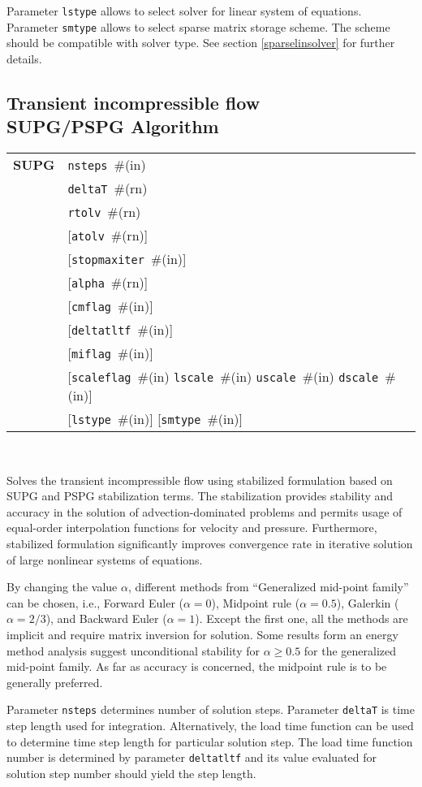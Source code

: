 \documentclass[a4paper]{report}
\newcommand{\param}[1]{\texttt{#1}} %
\newcommand{\optional}[1]{[#1]} %
\newcommand{\field}[2]{\param{#1}~\#{\tiny(#2)}} %
\newcommand{\optField}[2]{\optional{\field{#1}{#2}}}
\newcommand{\entKeywordInst}[1]{\textbf{#1}} %
\newenvironment{record}[1][]{\begin{tabular}{|ll}}{\end{tabular}\\}
\newcommand{\recentry}[2]{{#1}&{#2}\\}
\newcounter{rcc}
\newenvironment{record}[1][\textwidth]{\setcounter{rcc}{0}\rowcolors{1}{lightgray}{lightgray}\tabularx{#1}{llR} \hline}
               {\endtabularx}
\newcommand{\recentry}[2]{\ifthenelse{\value{rcc}>0}{$\backslash$ \\}{\setcounter{rcc}{1}}{#1}&{#2}&}
\begin{document}
Parameter \param{lstype} allows to select solver for linear system of
equations. Parameter \param{smtype} allows to select sparse matrix storage
scheme. The scheme should be compatible with solver type. See section
\ref{sparselinsolver} for further details.

\subsection{Transient incompressible flow\\SUPG/PSPG Algorithm}
\label{supgIncomp}
\begin{record}
  \recentry{\entKeywordInst{SUPG}}{\field{nsteps}{in}}
  \recentry{}{\field{deltaT}{rn}}
  \recentry{}{\field{rtolv}{rn}}
  \recentry{}{\optField{atolv}{rn}}
  \recentry{}{\optField{stopmaxiter}{in}}
  \recentry{}{\optField{alpha}{rn}}
  \recentry{}{\optField{cmflag}{in}}
  \recentry{}{\optField{deltatltf}{in}}
  \recentry{}{\optField{miflag}{in}}
  \recentry{}{\optional{\field{scaleflag}{in} \field{lscale}{in} \field{uscale}{in} \field{dscale}{in}}}
  \recentry{}{\optField{lstype}{in} \optField{smtype}{in}}
\end{record}

Solves the transient incompressible flow using stabilized formulation
based on SUPG and PSPG
stabilization terms. The stabilization provides
stability and accuracy in the solution of
advection-dominated problems and permits usage of equal-order
interpolation functions for velocity and pressure. Furthermore,
stabilized formulation significantly improves convergence rate in
iterative solution of large nonlinear systems of equations.

By changing the value $\alpha$, different methods from
``Generalized mid-point family'' can be chosen, i.e.,
Forward Euler ($\alpha=0$), Midpoint rule ($\alpha=0.5$),
 Galerkin ($\alpha=2/3$), and  Backward Euler ($\alpha=1$). Except
the first one, all the methods are implicit and require matrix inversion for solution.
Some results form an energy method analysis suggest unconditional
stability for $\alpha\ge 0.5$ for the generalized mid-point family. As
far as accuracy is concerned, the midpoint rule is to be generally preferred.

Parameter \param{nsteps} determines number of solution
steps. Parameter \param{deltaT} is time step length used for
integration. Alternatively, the load time function can be used to
determine time step length for particular solution step. The load time
function number is determined by parameter \param{deltatltf} and its
value evaluated for solution step number should yield the step length.
\end{document}
